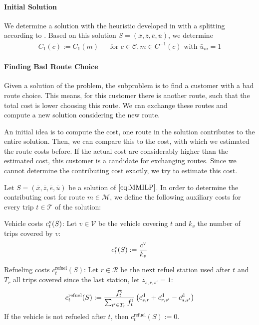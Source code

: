\paragraph{Initial Solution} \parfill

We determine a solution with the heuristic developed in  with a splitting according to . Based on this solution $S=\left(\bar{x},\bar{z},\bar{e},\bar{u}\right)$, we determine 
\begin{align*}
	C_1(c) := C_1(m) && \text{for } c\in\mathcal{C}, m\in C^{-1}(c) \text{ with } \bar{u}_m = 1
\end{align*}

\paragraph{Finding Bad Route Choice} \parfill

Given a solution of the problem, the subproblem is to find a customer with a bad route choice. This means, for this customer there is another route, such that the total cost is lower choosing this route. We can exchange these routes and compute a new solution considering the new route. 

An initial idea is to compute the cost, one route in the solution contributes to the entire solution. Then, we can compare this to the cost, with which we estimated the route costs before. If the actual cost are considerably higher than the estimated cost, this customer is a candidate for exchanging routes. Since we cannot determine the contributing cost exactly, we try to estimate this cost.

Let $S=\left(\bar{x},\bar{z},\bar{e},\bar{u}\right)$ be a solution of $\eqref{eq:MMILP}$. In order to determine the contributing cost for route $m\in\mathcal{M}$, we define the following auxiliary costs for every trip $t\in\mathcal{T}$ of the solution:

Vehicle costs $c^{\operatorname{v}}_t(S)$: Let $v\in\mathcal{V}$ be the vehicle covering $t$ and $k_v$ the number of trips covered by $v$:
\begin{align*}
	c^{\operatorname{v}}_t(S) := \frac{c^{\operatorname{v}}}{k_v}
\end{align*}

Refueling costs $c^{\operatorname{refuel}}_t(S)$: Let $r\in\mathcal{R}$ be the next refuel station used after $t$ and $T_r$ all trips covered since the last station, let $\bar{z}_{s,r,s'} = 1$:
\begin{align*}
	c^{\operatorname{refuel}}_t(S) := \frac{f^{\operatorname{t}}_t}{\sum_{t'\in T_r} f^{\operatorname{t}}_t}\left(c^{\operatorname{d}}_{s,r}+c^{\operatorname{d}}_{r,s'}-c^{\operatorname{d}}_{s,s'}\right)
\end{align*}
If the vehicle is not refueled after $t$, then $c^{\operatorname{refuel}}_t(S) := 0$.

